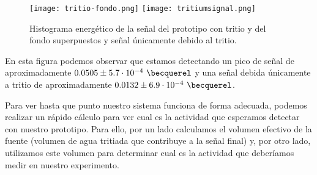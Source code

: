\begin{figure}[htb]
\centering
{
\texttt{[image: tritio-fondo.png]} 
}
{
\texttt{[image: tritiumsignal.png]} 
}
\caption{Histograma energético de la señal del prototipo con tritio y del fondo superpuestos y señal únicamente debido al tritio.\label{senaltritio}}
\end{figure}


En esta figura podemos observar que estamos detectando un pico de señal de aproximadamente $0.0505 \pm 5.7 \cdot 10^{-4}~\becquerel$ y una señal debida únicamente a tritio de aproximadamente $0.0132 \pm 6.9 \cdot 10^{-4}~\becquerel$. 

Para ver hasta que punto nuestro sistema funciona de forma adecuada, podemos realizar un rápido cálculo para ver cual es la actividad que esperamos detectar con nuestro prototipo. Para ello, por un lado calculamos el volumen efectivo de la fuente (volumen de agua tritiada que  contribuye a la señal final) y, por otro lado, utilizamos este volumen para determinar cual es la actividad que deberíamos medir en nuestro experimento.

